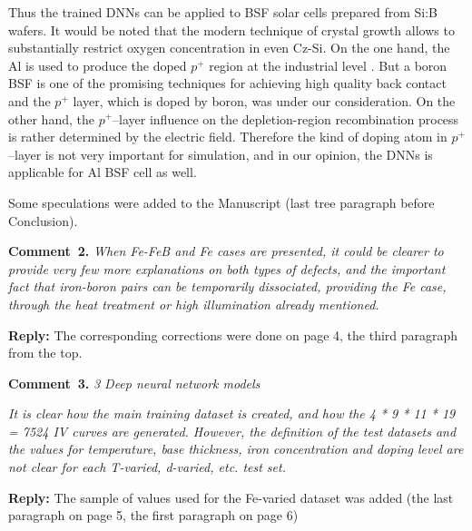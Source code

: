 \documentclass[num-refs]{wiley-article} %
\begin{document}
Thus the trained DNNs can be applied to BSF solar cells prepared from Si:B wafers.
It would be noted that the modern  technique of crystal growth allows to substantially restrict
oxygen concentration in even Cz-Si.
On the one hand,  the Al is used to produce the doped $p^+$ region
at the industrial level \cite{GreenRew2019,WilsonRew2020}.
But a boron BSF is one of the promising techniques
for achieving high quality back contact \cite{Kim2007,B-BSF}
and the $p^{+}$ layer, which is doped by boron, was under our consideration.
On the other hand, the $p^+$--layer influence on the depletion-region recombination
process is rather determined by the electric field.
Therefore the kind of doping atom in $p^+$--layer is not very important for simulation,
and in our opinion, the  DNNs is applicable for Al BSF cell as well.


Some speculations were added to the Manuscript (last tree paragraph before Conclusion).


\vspace{1cm}
\noindent
\textcolor[rgb]{0.00,0.50,1.00}{\textbf{Comment~2.}}
\emph{When Fe-FeB and Fe cases are presented, it could be clearer to provide very few more explanations on both types of defects,
and the important fact that iron-boron pairs can be temporarily dissociated, providing the Fe case,
through the heat treatment or high illumination already mentioned. }

\vspace{0.5cm}
\noindent
\textcolor[rgb]{0.51,0.00,0.00}{\textbf{Reply:}}
The corresponding corrections were done on page 4, the third  paragraph from the top.


\vspace{1cm}
\noindent
\textcolor[rgb]{0.00,0.50,1.00}{\textbf{Comment~3.}}
\emph{3 Deep neural network models}

\emph{
It is clear how the main training dataset is created, and how the 4 * 9 * 11 * 19 = 7524 IV curves are generated.
However, the definition of the test datasets and the values for temperature,
base thickness, iron concentration and doping level are not clear for each T-varied, d-varied, etc. test set. }

\vspace{0.5cm}
\noindent
\textcolor[rgb]{0.51,0.00,0.00}{\textbf{Reply:}}
The sample of values used for the Fe-varied dataset was added
(the last paragraph on page 5, the first paragraph on page 6)
\end{document}
